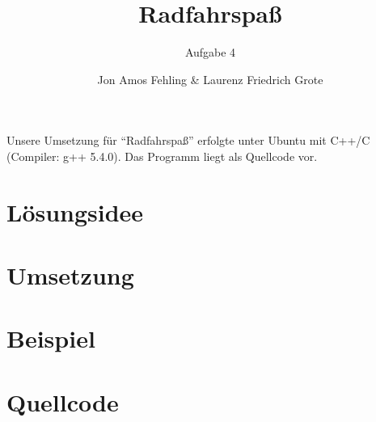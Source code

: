 \documentclass[parskip=full, DIV=14]{scrartcl}
\begin{document}
	\titlehead{35. Bundeswettbewerb Informatik \hfill Team 00001}
	\title{Radfahrspaß}
	\subtitle{Aufgabe 4}
	\author{Jon Amos Fehling \& Laurenz Friedrich Grote}
	\date{}
	\maketitle
	\tableofcontents
	
	\vspace {2em}
	Unsere Umsetzung für "`Radfahrspaß"' erfolgte unter Ubuntu mit C++/C (Compiler: g++ 5.4.0). Das Programm liegt als Quellcode vor.
	\clearpage
	\section{Lösungsidee}
		

	\section{Umsetzung}
		
	\clearpage
	\section{Beispiel}
		
	\clearpage
	\section{Quellcode}
		
\end{document}
